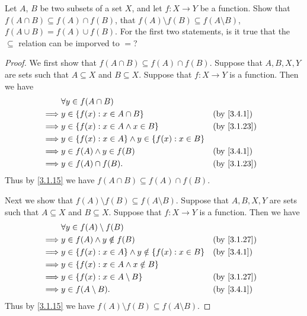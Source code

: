 \begin{ex}\label{ex:3.4.3}
	Let \(A\), \(B\) be two subsets of a set \(X\), and let \(f : X \to Y\) be a function.
	Show that \(f(A \cap B) \subseteq f(A) \cap f(B)\), that \(f(A) \setminus f(B) \subseteq f(A \setminus B)\), \(f(A \cup B) = f(A) \cup f(B)\).
	For the first two statements, is it true that the \(\subseteq\) relation can be imporved to \(=\)?
\end{ex}

\begin{proof}
	We first show that \(f(A \cap B) \subseteq f(A) \cap f(B)\).
	Suppose that \(A, B, X, Y\) are sets such that \(A \subseteq X\) and \(B \subseteq X\).
	Suppose that \(f : X \to Y\) is a function.
	Then we have
	\begin{align*}
		         & \forall y \in f(A \cap B)                                                    \\
		\implies & y \in \set{f(x) : x \in A \cap B}                           &  & \by{3.4.1}  \\
		\implies & y \in \set{f(x) : x \in A \land x \in B}                    &  & \by{3.1.23} \\
		\implies & y \in \set{f(x) : x \in A} \land y \in \set{f(x) : x \in B}                  \\
		\implies & y \in f(A) \land y \in f(B)                                 &  & \by{3.4.1}  \\
		\implies & y \in f(A) \cap f(B).                                       &  & \by{3.1.23}
	\end{align*}
	Thus by \cref{3.1.15} we have \(f(A \cap B) \subseteq f(A) \cap f(B)\).

	Next we show that \(f(A) \setminus f(B) \subseteq f(A \setminus B)\).
	Suppose that \(A, B, X, Y\) are sets such that \(A \subseteq X\) and \(B \subseteq X\).
	Suppose that \(f : X \to Y\) is a function.
	Then we have
	\begin{align*}
		         & \forall y \in f(A) \setminus f(B)                                               \\
		\implies & y \in f(A) \land y \notin f(B)                                 &  & \by{3.1.27} \\
		\implies & y \in \set{f(x) : x \in A} \land y \notin \set{f(x) : x \in B} &  & \by{3.4.1}  \\
		\implies & y \in \set{f(x) : x \in A \land x \notin B}                                     \\
		\implies & y \in \set{f(x) : x \in A \setminus B}                         &  & \by{3.1.27} \\
		\implies & y \in f(A \setminus B).                                        &  & \by{3.4.1}
	\end{align*}
	Thus by \cref{3.1.15} we have \(f(A) \setminus f(B) \subseteq f(A \setminus B)\).


\end{proof}
